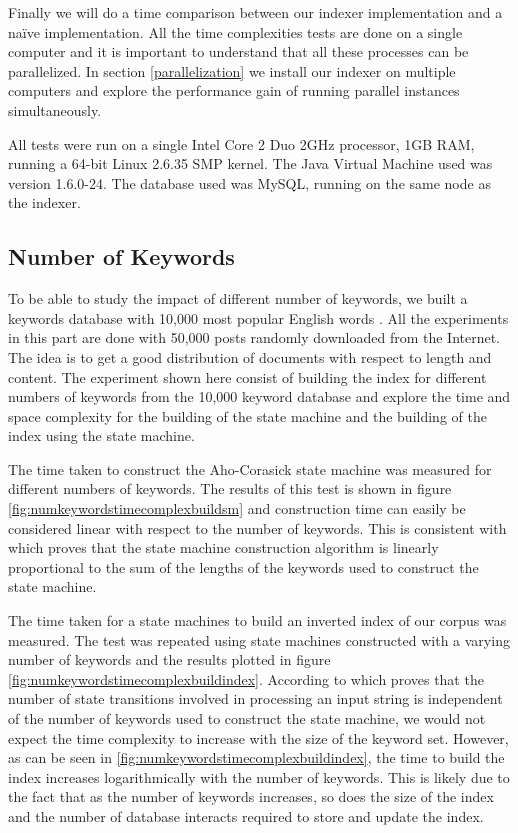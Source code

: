 \documentclass[10pt]{article}
\begin{document}
Finally we will do a time comparison between our indexer
implementation and a na\"{i}ve implementation. All the time
complexities tests are done on a single computer and it is important
to understand that all these processes can be parallelized. In section
\ref{parallelization} we install our indexer on multiple computers and
explore the performance gain of running parallel instances
simultaneously.

All tests were run on a single Intel Core 2 Duo 2GHz processor, 1GB
RAM, running a 64-bit Linux 2.6.35 SMP kernel. The Java Virtual
Machine used was version 1.6.0-24. The database used was MySQL,
running on the same node as the indexer.


\subsection{Number of Keywords}
To be able to study the impact of different number of keywords, we
built a keywords database with 10,000 most popular English
words \cite{wordlist}. All the experiments in this
part are done with 50,000 posts randomly downloaded from the Internet. The
idea is to get a good distribution of documents with respect to length
and content. The experiment shown here consist of building the index
for different numbers of keywords from the 10,000 keyword database and
explore the time and space complexity for the building of the state
machine and the building of the index using the state machine.

The time taken to construct the Aho-Corasick state machine was
measured for different numbers of keywords. The results of this test
is shown in figure \ref{fig:numkeywordstimecomplexbuildsm} and
construction time can easily be considered linear with respect to the
number of keywords. This is consistent with \cite{RefWorks:103} which
proves that the state machine construction algorithm is linearly
proportional to the sum of the lengths of the keywords used to
construct the state machine.

The time taken for a state machines to build an inverted index of our
corpus was measured. The test was repeated using state machines
constructed with a varying number of keywords and the results plotted
in figure \ref{fig:numkeywordstimecomplexbuildindex}. According to
\cite{RefWorks:103} which proves that the number of state transitions
involved in processing an input string is independent of the number of
keywords used to construct the state machine, we would not expect the
time complexity to increase with the size of the keyword set. However,
as can be seen in \ref{fig:numkeywordstimecomplexbuildindex}, the time
to build the index increases logarithmically with the number of
keywords. This is likely due to the fact that as the number of
keywords increases, so does the size of the index and the number of
database interacts required to store and update the index.
\end{document}
